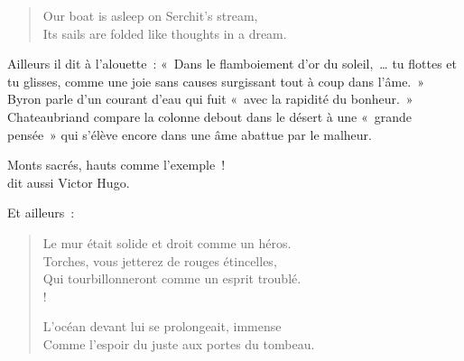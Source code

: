 \documentclass[french,twoside]{book} %
\begin{document}
\begin{verse}
Our boat is asleep on Serchit’s stream,\\
Its sails are folded like thoughts in a dream. \\
\end{verse}

\noindent Ailleurs il dit à l’alouette : « Dans le flamboiement d’or du soleil, … tu flottes et tu glisses, comme une joie sans causes surgissant tout à coup dans l’âme. » Byron parle d’un courant d’eau qui fuit « avec la rapidité du bonheur. » Chateaubriand compare la colonne debout dans le désert à une « grande pensée » qui s’élève encore dans une âme abattue par le malheur.\par

Monts sacrés, hauts comme l’exemple !\\

\noindent dit aussi Victor Hugo.\par
Et ailleurs :\par


\begin{verse}
Le mur était solide et droit comme un héros.\\
Torches, vous jetterez de rouges étincelles,\\
Qui tourbillonneront comme un esprit troublé.\\!

L’océan devant lui se prolongeait, immense\\
Comme l’espoir du juste aux portes du tombeau.\\
\end{verse}
\end{document}
